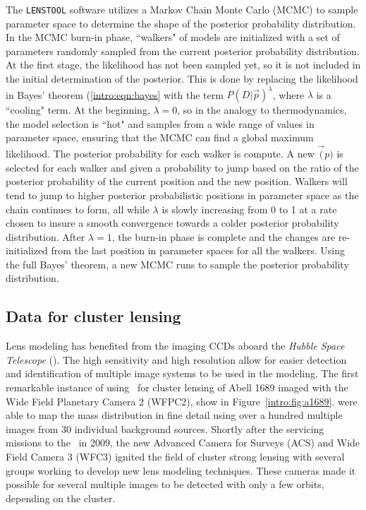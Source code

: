 The \texttt{LENSTOOL} software utilizes a Markov Chain Monte Carlo (MCMC) to sample parameter space to determine the shape of the posterior probability distribution. In the MCMC burn-in phase, ``walkers" of models are initialized with a set of parameters randomly sampled from the current posterior probability distribution. At the first stage, the likelihood has not been sampled yet, so it is not included in the initial determination of the posterior. This is done by replacing the likelihood in Bayes' theorem (\ref{intro:eqn:bayes} with the term $P(D | \vec{p} )^\lambda$, where $\lambda$ is a ``cooling" term. At the beginning, $\lambda=0$, so in the analogy to thermodynamics, the model selection is ``hot" and samples from a wide range of values in parameter space, ensuring that the MCMC can find a global maximum likelihood. The posterior probability for each walker is compute. A new $\vec(p)$ is selected for each walker and given a probability to jump based on the ratio of the posterior probability of the current position and the new position. Walkers will tend to jump to higher posterior probabilistic positions in parameter space as the chain continues to form, all while $\lambda$ is slowly increasing from 0 to 1 at a rate chosen to insure a smooth convergence towards a colder posterior probability distribution. After $\lambda=1$, the burn-in phase is complete and the changes are re-initialized from the last position in parameter spaces for all the walkers. Using the full Bayes' theorem, a new MCMC runs to sample the posterior probability distribution.

\subsection{Data for cluster lensing}

Lens modeling has benefited from the imaging CCDs aboard the {\it Hubble Space Telescope} (\hst). The high sensitivity and high resolution allow for easier detection and identification of multiple image systems to be used in the modeling. The first remarkable instance of using \hst\ for cluster lensing of Abell 1689 imaged with the Wide Field Planetary Camera 2 (WFPC2), show in Figure~\ref{intro:fig:a1689}. \citet{Broadhurst:2005qy} were able to map the mass distribution in fine detail using over a hundred multiple images from 30 individual background sources. Shortly after the servicing missions to the \hst\ in 2009, the new Advanced Camera for Surveys (ACS) and Wide Field Camera 3 (WFC3) ignited the field of cluster strong lensing with several groups working to develop new lens modeling techniques. These cameras made it possible for several multiple images to be detected with only a few orbits, depending on the cluster. 


